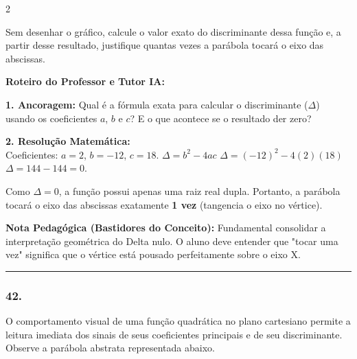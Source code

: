 \begin{multicols*}{2}
\begin{enunciadoLiteral}
Sem desenhar o gráfico, calcule o valor exato do discriminante dessa função e, a partir desse resultado, justifique quantas vezes a parábola tocará o eixo das abscissas.
\end{enunciadoLiteral}

\ifgabarito
    \begin{tcolorbox}[colback=CorTitUm!5, colframe=CorTitUm, boxrule=1pt, arc=4pt, left=6pt, right=6pt, top=6pt, bottom=6pt]
    \small\textbf{\textcolor{CorTitUm}{Roteiro do Professor e Tutor IA:}}\par\vspace{0.1cm}
    \color{CinzaEscuro}
    \textbf{1. Ancoragem:} Qual é a fórmula exata para calcular o discriminante ($\Delta$) usando os coeficientes $a$, $b$ e $c$? E o que acontece se o resultado der zero?\par\vspace{0.1cm}
    \textbf{2. Resolução Matemática:}\\
    Coeficientes: $a=2$, $b=-12$, $c=18$.
    $\Delta = b^2 - 4ac$
    $\Delta = (-12)^2 - 4(2)(18)$
    $\Delta = 144 - 144 = 0$.
    
    Como $\Delta = 0$, a função possui apenas uma raiz real dupla. Portanto, a parábola tocará o eixo das abscissas exatamente \textbf{1 vez} (tangencia o eixo no vértice).
    \end{tcolorbox}
    \vspace{0.15cm}
    
    \begin{boxexplicacao}
    \textbf{Nota Pedagógica (Bastidores do Conceito):} Fundamental consolidar a interpretação geométrica do Delta nulo. O aluno deve entender que "tocar uma vez" significa que o vértice está pousado perfeitamente sobre o eixo X.
    \end{boxexplicacao}
\fi

\par\vspace{\espacoQuestao}

\noindent\textcolor{CorLinha}{\rule{\linewidth}{0.5pt}} 
\par\vspace{\espacoPreQuestao}
\subsubsection*{42.} 
\begin{enunciadoLiteral}
O comportamento visual de uma função quadrática no plano cartesiano permite a leitura imediata dos sinais de seus coeficientes principais e de seu discriminante. Observe a parábola abstrata representada abaixo.


\end{enunciadoLiteral}
\end{multicols*}
